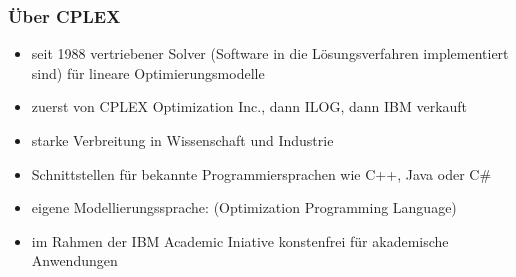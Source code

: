 \begin{frame}
 \frametitle{Über CPLEX}
 \begin{itemize}
  \item seit 1988 vertriebener Solver (Software in die Lösungsverfahren implementiert sind) für lineare Optimierungsmodelle
  \item zuerst von CPLEX Optimization Inc., dann ILOG, dann IBM verkauft
  \item starke Verbreitung in Wissenschaft und Industrie
  \item Schnittstellen für bekannte Programmiersprachen wie C++, Java oder C\#
  \item eigene Modellierungssprache:  (Optimization Programming Language)
  \item im Rahmen der IBM Academic Iniative konstenfrei für akademische Anwendungen
 \end{itemize}
\end{frame}
